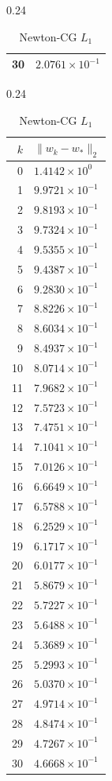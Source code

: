\documentclass[italian, a4paper, twoside, binding=6mm]{sapthesis}
\begin{document}
\begin{table}[H]
\begin{subtable}{0.24\textwidth}
\begin{tabular}{@{}rl@{}}
30 & $2.0761\times10^{-1}$\\
\bottomrule
\end{tabular}
\end{subtable}\hfill
\begin{subtable}{0.24\textwidth}
\centering
\caption{Newton-CG $L_1$}
\begin{tabular}{@{}rl@{}}
\toprule
$k$ & $\|w_k-w_*\|_2$\\
\midrule
0 & $1.4142\times10^{0}$\\
1 & $9.9721\times10^{-1}$\\
2 & $9.8193\times10^{-1}$\\
3 & $9.7324\times10^{-1}$\\
4 & $9.5355\times10^{-1}$\\
5 & $9.4387\times10^{-1}$\\
6 & $9.2830\times10^{-1}$\\
7 & $8.8226\times10^{-1}$\\
8 & $8.6034\times10^{-1}$\\
9 & $8.4937\times10^{-1}$\\
10 & $8.0714\times10^{-1}$\\
11 & $7.9682\times10^{-1}$\\
12 & $7.5723\times10^{-1}$\\
13 & $7.4751\times10^{-1}$\\
14 & $7.1041\times10^{-1}$\\
15 & $7.0126\times10^{-1}$\\
16 & $6.6649\times10^{-1}$\\
17 & $6.5788\times10^{-1}$\\
18 & $6.2529\times10^{-1}$\\
19 & $6.1717\times10^{-1}$\\
20 & $6.0177\times10^{-1}$\\
21 & $5.8679\times10^{-1}$\\
22 & $5.7227\times10^{-1}$\\
23 & $5.6488\times10^{-1}$\\
24 & $5.3689\times10^{-1}$\\
25 & $5.2993\times10^{-1}$\\
26 & $5.0370\times10^{-1}$\\
27 & $4.9714\times10^{-1}$\\
28 & $4.8474\times10^{-1}$\\
29 & $4.7267\times10^{-1}$\\
30 & $4.6668\times10^{-1}$\\
\bottomrule
\end{tabular}

\end{subtable}
\end{table}
\end{document}
